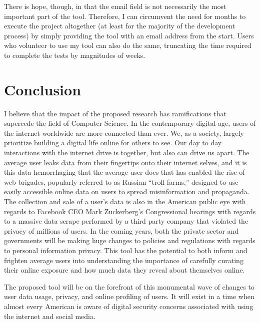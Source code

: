 \documentclass[11pt]{article}
\begin{document}
There is hope, though, in that the email field is not necessarily the most important part of the tool. Therefore, I can circumvent the need for months to execute the project altogether (at least for the majority of the development process) by simply providing the tool with an email address from the start. Users who volunteer to use my tool can also do the same, truncating the time required to complete the tests by magnitudes of weeks. 

\vspace*{-.1in}
\section{Conclusion}
\label{sec:conclusion}
\vspace*{-.1in}


I believe that the impact of the proposed research has ramifications that supercede the field of Computer Science. In the contemporary digital age, users of the internet worldwide are more connected than ever. We, as a society, largely prioritize building a digital life online for others to see. Our day to day interactions with the internet drive is together, but also can drive us apart. The average user leaks data from their fingertips onto their internet selves, and it is this data hemorrhaging that the average user does that has enabled the rise of web brigades, popularly referred to as Russian ``troll farms,'' designed to use easily accessible online data on users to spread misinformation and propaganda. The collection and sale of a user's data is also in the American public eye with regards to Facebook CEO Mark Zuckerberg's Congressional hearings with regards to a massive data scrape performed by a third party company that violated the privacy of millions of users. In the coming years, both the private sector and governments will be making huge changes to policies and regulations with regards to personal information privacy. This tool has the potential to both inform and frighten average users into understanding the importance of carefully curating their online exposure and how much data they reveal about themselves online.

The proposed tool will be on the forefront of this monumental wave of changes to user data usage, privacy, and online profiling of users. It will exist in a time when almost every American is aware of digital security concerns associated with using the internet and social media. 



\end{document}
